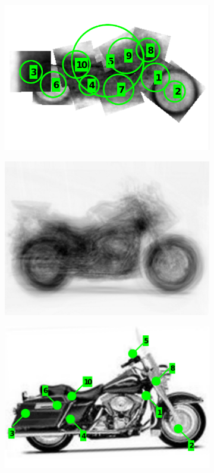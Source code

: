 \begin{figure}[ht]
\begin{subfigure}[b]{0.28\linewidth}
	\includegraphics[width=\linewidth]{fig/reg/pictorial2.pdf}
	\label{fig/reg/concept4}
\end{subfigure}
\begin{subfigure}[b]{0.28\linewidth} \centering 
	\includegraphics[width=\linewidth]{fig/reg/avgbike_after.png}
	\label{fig/reg/concept3}
\end{subfigure}
\begin{subfigure}[b]{0.28\linewidth} \centering 
	\includegraphics[width=\linewidth]{fig/reg/onebike_after3.pdf}

\end{subfigure}
\end{figure}
